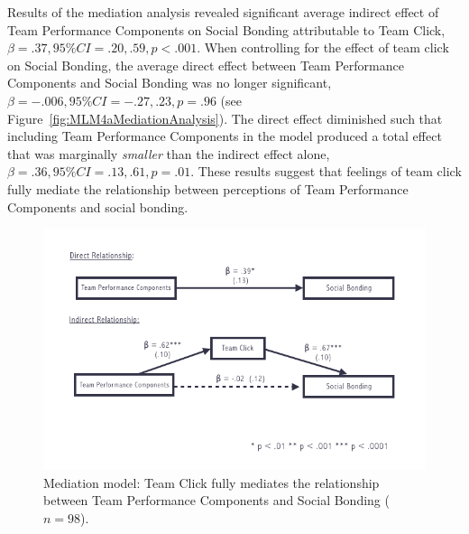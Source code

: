 \begin{CJK}{UTF8}{gbsn}
  Results of the mediation analysis revealed significant average indirect effect of Team Performance Components on Social Bonding attributable to Team Click, $\beta = .37, 95\% CI = .20 , .59, p < .001$.  When controlling for the effect of team click on Social Bonding, the average direct effect between Team Performance Components and Social Bonding was no longer significant, $\beta = -.006, 95\% CI = -.27 , .23, p = .96 $ (see Figure~\ref{fig:MLM4aMediationAnalysis}). The direct effect diminished such that including Team Performance Components in the model produced a total effect that was marginally \textit{smaller} than the indirect effect alone, $\beta = .36, 95\% CI = .13 , .61, p = .01$. These results suggest that feelings of team click fully mediate the relationship between perceptions of Team Performance Components and social bonding.



  \begin{figure}
    \centering
    \includegraphics[width=0.9\linewidth,keepaspectratio] {images/tournamentSurveyMediationFigure}
    \caption{Mediation model: Team Click fully mediates the relationship between Team Performance Components and Social Bonding ($n = 98$).}
    \label{fig:tournamentSurveyMediationFigure}
  \end{figure}



\end{CJK}
